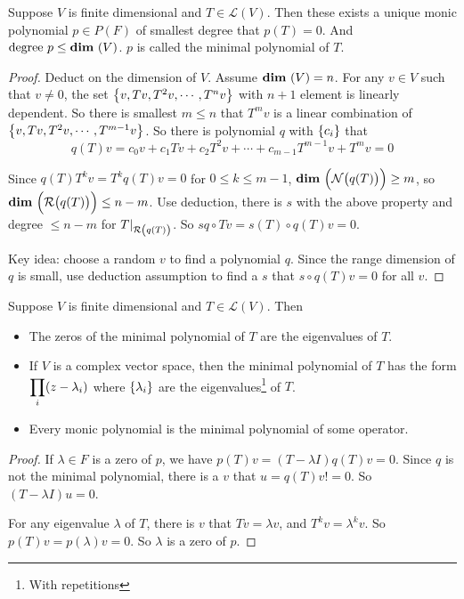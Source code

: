 \begin{theorem}
    Suppose $V$ is finite dimensional and $T \in \mathcal{L}(V)$. Then these exists a unique monic polynomial $p\in P(F)$ of smallest degree that $p(T) = 0$. And $\text{degree }p \leq \dimension{V}$. $p$ is called the minimal polynomial of $T$. 
\end{theorem}
\begin{proof}
    Deduct on the dimension of $V$. Assume $\dimension{V} = n$. For any $v \in V$ such that $v \neq 0$, the set $\set{v, Tv, T^2v, \cdots, T^n v}$ with $n+1$ element is linearly dependent. So there is smallest $m \leq n$ that $T^m v$ is a linear combination of $\set{v, Tv, T^2v, \cdots, T^{m-1} v}$. So there is polynomial $q$ with $\set{c_i}$ that
    \begin{equation*}
        q(T) v = c_0 v + c_1 Tv + c_2 T^2 v + \cdots + c_{m-1} T^{m-1} v + T^m v = 0
    \end{equation*}
    
    Since $q(T)T^k v = T^k q(T) v = 0$ for $0 \leq k \leq m-1$, $\dimension{\nullspace{q(T)}} \geq m$, so $\dimension{\rangespace{q(T)}} \leq n - m$. Use deduction, there is $s$ with the above property and degree $\leq n - m$ for $\functionrestriction{T}{\rangespace{q(T)}}$. So $sq \circ Tv = s(T) \circ q(T) v = 0$.
    
    Key idea: choose a random $v$ to find a polynomial $q$. Since the range dimension of $q$ is small, use deduction assumption to find a $s$ that $s \circ q(T)v =0$ for all $v$.
\end{proof}


\begin{theorem}
    Suppose $V$ is finite dimensional and $T \in \mathcal{L}(V)$. Then
    \begin{itemize}
        \item The zeros of the minimal polynomial of $T$ are the eigenvalues of $T$.
        \item If $V$ is a complex vector space, then the minimal polynomial of $T$ has the form $\displaystyle \prod_i \mleft(z-\lambda_i\mright)$ where $\set{\lambda_i}$ are the eigenvalues\footnote{With repetitions} of $T$.
        \item Every monic polynomial is the minimal polynomial of some operator.
    \end{itemize}
\end{theorem}
\begin{proof}
    If $\lambda \in F$ is a zero of $p$, we have $p(T)v = (T - \lambda I)q(T) v = 0$. Since $q$ is not the minimal polynomial, there is a $v$ that $u = q(T)v != 0$. So $(T - \lambda I) u = 0$.
    
    For any eigenvalue $\lambda$ of $T$, there is $v$ that $Tv = \lambda v$, and $T^k v = \lambda^k v$. So $p(T)v = p(\lambda)v = 0$. So $\lambda$ is a zero of $p$.
\end{proof}


